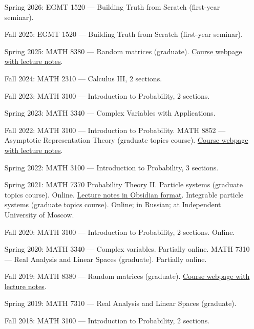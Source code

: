 \documentclass[letterpaper,11pt]{article}
\begin{document}
\begin{itemize}
\item[Spring 2026:]
    EGMT 1520 --- Building Truth from Scratch (first-year seminar).
\item[Fall 2025:]
    EGMT 1520 --- Building Truth from Scratch (first-year seminar).
\item[Spring 2025:]
    MATH 8380 --- Random matrices (graduate).
    \href{https://lpetrov.cc/rmt25/}{Course webpage with lecture notes}.

\item[Fall 2024:]
    MATH 2310 --- Calculus III, 2 sections.

\item[Fall 2023:]
	MATH 3100 --- Introduction to Probability, 2 sections.

\item[Spring 2023:]
	MATH 3340 --- Complex Variables with Applications.

\item[Fall 2022:]
	MATH 3100 --- Introduction to Probability.
	MATH 8852 --- Asymptotic Representation Theory (graduate topics course). \href{https://lpetrov.cc/art2022/}{Course webpage with lecture notes}.

\item[Spring 2022:]
	MATH 3100 --- Introduction to Probability, 3 sections.

\item[Spring 2021:]
	MATH 7370 Probability Theory II. Particle systems (graduate topics course). Online. \href{https://github.com/lenis2000/HTML_ParticleSysS21}{Lecture notes in Obsidian format}.
	Integrable particle systems (graduate topics course). Online; in Russian; at Independent University of Moscow.

\item[Fall 2020:]
	MATH 3100 --- Introduction to Probability, 2 sections. Online.

\item[Spring 2020:]
	MATH 3340 --- Complex variables. Partially online.
	MATH 7310 --- Real Analysis and Linear Spaces (graduate). Partially online.

\item[Fall 2019:]
	MATH 8380 --- Random matrices (graduate). \href{https://lpetrov.cc/rmt19/}{Course webpage with lecture notes}.

\item[Spring 2019:]
	MATH 7310 --- Real Analysis and Linear Spaces (graduate).

\item[Fall 2018:]
	MATH 3100 --- Introduction to Probability, 2 sections.


\end{itemize}
\end{document}

